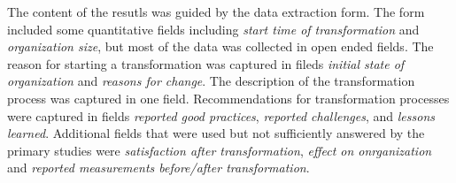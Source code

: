 \documentclass[lnbip]{svmultln}
\begin{document}
The content of the resutls was guided by the data extraction form. The form
included some quantitative fields including \textit{start time of
transformation} and \textit{organization size}, but most of the data was
collected in open ended fields. The reason for starting a transformation was
captured in fileds \textit{initial state of organization} and \textit{reasons
for change}. The description of the transformation process was captured in one
field. Recommendations for transformation processes were captured in fields
\textit{reported good practices}, \textit{reported challenges}, and
\textit{lessons learned}. Additional fields that were used but not sufficiently
answered by the primary studies were \textit{satisfaction after transformation},
\textit{effect on onrganization} and \textit{reported measurements before/after
transformation}.

\end{document}
